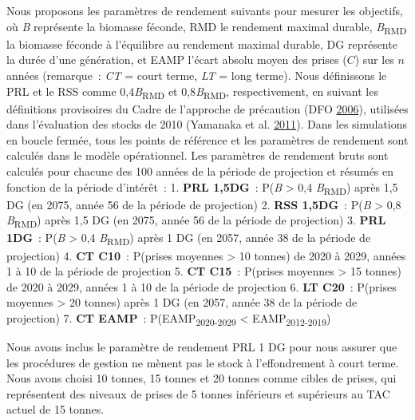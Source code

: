 \documentclass[11pt]{book}
\begin{document}
Nous proposons les paramètres de rendement suivants pour mesurer les objectifs, où \emph{B} représente la biomasse féconde, RMD le rendement maximal durable, \emph{B}\textsubscript{RMD} la biomasse féconde à l'équilibre au rendement maximal durable, DG représente la durée d'une génération, et EAMP l'écart absolu moyen des prises (\(C\)) sur les \(n\) années (remarque~: \emph{CT} = court terme, \emph{LT} = long terme). Nous définissons le PRL et le RSS comme 0,4\emph{B}\textsubscript{RMD} et 0,8\emph{B}\textsubscript{RMD}, respectivement, en suivant les définitions provisoires du Cadre de l'approche de précaution (DFO \protect\hyperlink{ref-dfo2006}{2006}), utilisées dans l'évaluation des stocks de 2010 (Yamanaka et al. \protect\hyperlink{ref-yamanaka2011}{2011}). Dans les simulations en boucle fermée, tous les points de référence et les paramètres de rendement sont calculés dans le modèle opérationnel. Les paramètres de rendement bruts sont calculés pour chacune des 100 années de la période de projection et résumés en fonction de la période d'intérêt~: 1. \textbf{PRL 1,5DG}~: P(\emph{B} \textgreater{} 0,4 \emph{B}\textsubscript{RMD}) après 1,5 DG (en 2075, année 56 de la période de projection) 2. \textbf{RSS 1,5DG}~: P(\emph{B} \textgreater{} 0,8 \emph{B}\textsubscript{RMD}) après 1,5 DG (en 2075, année 56 de la période de projection) 3. \textbf{PRL 1DG}~: P(\emph{B} \textgreater{} 0,4 \emph{B}\textsubscript{RMD}) après 1 DG (en 2057, année 38 de la période de projection) 4. \textbf{CT C10}~: P(prises moyennes \textgreater{} 10 tonnes) de 2020 à 2029, années 1 à 10 de la période de projection 5. \textbf{CT C15}~: P(prises moyennes \textgreater{} 15 tonnes) de 2020 à 2029, années 1 à 10 de la période de projection 6. \textbf{LT C20}~: P(prises moyennes \textgreater{} 20 tonnes) après 1 DG (en 2057, année 38 de la période de projection) 7. \textbf{CT EAMP}~: P(EAMP\textsubscript{2020-2029} \textless{} EAMP\textsubscript{2012-2019})

Nous avons inclus le paramètre de rendement PRL 1 DG pour nous assurer que les procédures de gestion ne mènent pas le stock à l'effondrement à court terme. Nous avons choisi 10 tonnes, 15 tonnes et 20 tonnes comme cibles de prises, qui représentent des niveaux de prises de 5 tonnes inférieurs et supérieurs au TAC actuel de 15 tonnes.
\end{document}
